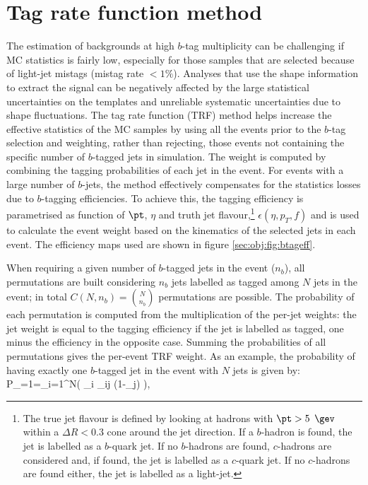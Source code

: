 \section{Tag rate function method}
\label{chp:sec:trf}

The estimation of backgrounds at high $b$-tag multiplicity can be challenging if MC statistics is fairly low, especially for those samples that are selected because of light-jet mistags (mistag rate $<1\%$). Analyses that use the shape information to extract the signal can be negatively affected by the large statistical uncertainties on the templates and unreliable systematic uncertainties due to shape fluctuations. The tag rate function (TRF) method \cite{Shibata:1042972,TRF} helps increase the effective statistics of the MC samples by using all the events prior to the $b$-tag selection and weighting, rather than rejecting, those events not containing the specific number of $b$-tagged jets in simulation. The weight is computed by combining the tagging probabilities of each jet in the event. For events with a large number of $b$-jets, the method effectively compensates for the statistics losses due to $b$-tagging efficiencies. To achieve this, the tagging efficiency is parametrised as function of $\pt$, $\eta$ and truth jet flavour,\footnote{The true jet flavour is defined by looking at hadrons with $\pt > 5$ $\gev$ within a $\Delta R < 0.3$ cone around the jet direction. If a $b$-hadron is found, the jet is labelled as a $b$-quark jet. If no $b$-hadrons are found, $c$-hadrons are considered and, if found, the jet is labelled as a $c$-quark jet. If no $c$-hadrons are found either, the jet is labelled as a light-jet.} $\epsilon(\eta,p_{T},f)$ and is used to calculate the event weight based on the kinematics of the selected jets in each event. The efficiency maps used are shown in figure \ref{sec:obj:fig:btageff}.

When requiring a given number of $b$-tagged jets in the event ($n_{b}$), all permutations are built considering $n_{b}$ jets labelled as tagged among $N$ jets in the event; in total $C(N,n_{b})=\binom{N}{n_{b}}$ permutations are possible. The probability of each permutation is computed from the multiplication of the per-jet weights: the jet weight is equal to the tagging efficiency if the jet is labelled as tagged, one minus the efficiency in the opposite case. Summing the probabilities of all permutations gives the per-event TRF weight. As an example, the probability of having exactly one $b$-tagged jet in the event with $N$ jets is given by:
\be
P_{=1}=\displaystyle\sum_{i=1}^{N}\left( \epsilon_{i} \displaystyle\prod_{i\neq j} (1-\epsilon_{j}) \right),
\ee

